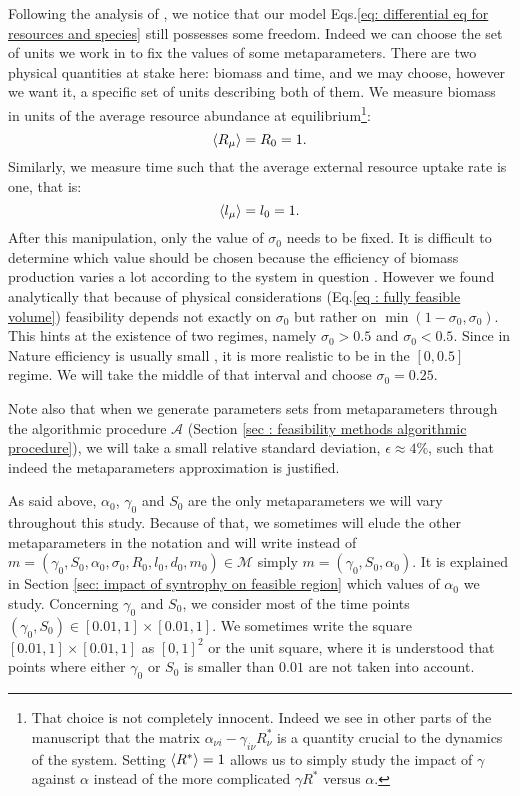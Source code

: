 \documentclass[12pt]{report}
\begin{document}
Following the analysis of \cite{barbier_cavity_2017}, we notice that our model Eqs.\eqref{eq: differential eq for resources and species} still possesses some freedom. Indeed we can choose the set of units we work in to fix the values of some metaparameters. There are two physical quantities at stake here: biomass and time, and we may choose, however we want it, a specific set of units describing both of them.
We measure biomass in units of the average resource abundance at equilibrium\footnote{That choice is not completely innocent. Indeed we see in other parts of the manuscript that the matrix $\alpha_{\nu i}-\gamma_{i \nu} R^*_\nu$ is a quantity crucial to the dynamics of the system. Setting $\langle R^* \rangle=1$ allows us to simply study the impact of $\gamma$ against $\alpha$ instead of the more complicated $\gamma R^*$ versus $\alpha$.}:
\begin{equation}
 \langle R_\mu \rangle = R_0 = 1.
\end{equation}
Similarly, we measure time such that the average external resource uptake rate is one, that is:
\begin{equation}
\langle l_\mu \rangle = l_0 = 1.
\end{equation}
After this manipulation, only the value of $\sigma_0$ needs to be fixed. It is difficult to determine which value should be chosen because the efficiency of biomass production varies a lot according to the system in question \cite{delong_shifts_2010}. However we found analytically that because of physical considerations (Eq.\ref{eq : fully feasible volume}) feasibility depends not exactly on $\sigma_0$ but rather on $\min(1-\sigma_0, \sigma_0)$. This hints at the existence of two regimes, namely $\sigma_0 > 0.5$ and $\sigma_0 < 0.5$. Since in Nature efficiency is usually small \cite{delong_shifts_2010}, it is more realistic to be in the $[0, 0.5]$ regime. We will take the middle of that interval and choose $\sigma_0=0.25$.

Note also that when we generate parameters sets from metaparameters through the algorithmic procedure $\mathcal{A}$ (Section \ref{sec : feasibility methods algorithmic procedure}), we will take a small relative standard deviation, $\epsilon \approx 4 \%$, such that indeed the metaparameters approximation is justified.

As said above, $\alpha_0$, $\gamma_0$ and $S_0$ are the only metaparameters we will vary throughout this study. Because of that, we sometimes will elude the other metaparameters in the notation and will write instead of $m=(\gamma_0, S_0, \alpha_0, \sigma_0, R_0, l_0, d_0, m_0) \in \mathcal{M}$ simply $m=(\gamma_0, S_0, \alpha_0)$. It is explained in Section \ref{sec: impact of syntrophy on feasible region} which values of $\alpha_0$ we study. Concerning $\gamma_0$ and $S_0$, we consider most of the time points $(\gamma_0, S_0) \in [0.01, 1]\times[0.01, 1]$. We sometimes write the square $[0.01, 1]\times[0.01, 1]$ as $[0,1]^2$ or the unit square, where it is understood that points where either $\gamma_0$ or $S_0$ is smaller than $0.01$ are not taken into account.
\end{document}
